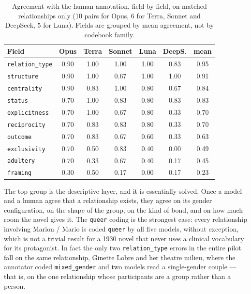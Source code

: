 \begin{table}[h]
  \centering
  \small
  \begin{tabular}{lcccccc}
    \toprule
    Field & Opus & Terra & Sonnet & Luna & DeepS. & mean \\
    \midrule
    \texttt{relation\_type} & 0.90 & 1.00 & 1.00 & 1.00 & 0.83 & 0.95 \\
    \texttt{structure}      & 0.90 & 1.00 & 0.67 & 1.00 & 1.00 & 0.91 \\
    \texttt{centrality}     & 0.90 & 0.83 & 1.00 & 0.80 & 0.67 & 0.84 \\
    \texttt{status}         & 0.70 & 1.00 & 0.83 & 0.80 & 0.83 & 0.83 \\
    \midrule
    \texttt{explicitness}   & 0.70 & 1.00 & 0.67 & 0.80 & 0.33 & 0.70 \\
    \texttt{reciprocity}    & 0.70 & 0.83 & 0.83 & 0.80 & 0.33 & 0.70 \\
    \texttt{outcome}        & 0.70 & 0.83 & 0.67 & 0.60 & 0.33 & 0.63 \\
    \midrule
    \texttt{exclusivity}    & 0.70 & 0.50 & 0.83 & 0.40 & 0.00 & 0.49 \\
    \texttt{adultery}       & 0.70 & 0.33 & 0.67 & 0.40 & 0.17 & 0.45 \\
    \texttt{framing}        & 0.30 & 0.50 & 0.17 & 0.00 & 0.17 & 0.23 \\
    \bottomrule
  \end{tabular}
  \caption{Agreement with the human annotation, field by field, on matched
  relationships only (10 pairs for Opus, 6 for Terra, Sonnet and DeepSeek, 5 for
  Luna). Fields are grouped by mean agreement, not by codebook family.}
  \label{tab:field-results}
\end{table}

The top group is the descriptive layer, and it is essentially solved. Once a model
and a human agree that a relationship exists, they agree on its gender configuration,
on the shape of the group, on the kind of bond, and on how much room the novel gives
it. The \texttt{queer} coding is the strongest case: every relationship involving
Marion / Mario is coded \texttt{queer} by all five models, without exception, which
is not a trivial result for a 1930 novel that never uses a clinical vocabulary for
its protagonist. In fact the only two \texttt{relation\_type} errors in the entire
pilot fall on the same relationship, Ginette Lobre and her theatre milieu, where the
annotator coded \texttt{mixed\_gender} and two models read a single-gender couple ---
that is, on the one relationship whose participants are a group rather than a person.

